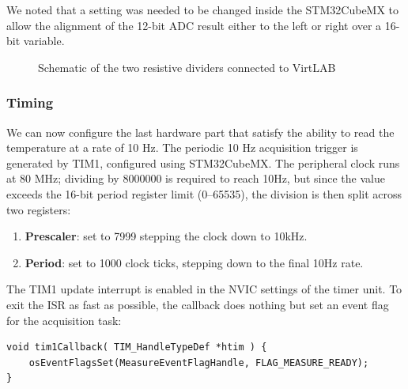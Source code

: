 \documentclass[../main.tex]{subfiles}
\begin{document}
We noted that a setting was needed to be changed inside the STM32CubeMX to allow the alignment of the 12-bit ADC result either to the left or right over a 16-bit variable.

\begin{figure}[h!]
\centering
{}
\caption{Schematic of the two resistive dividers connected to VirtLAB}
\label{fig:schematic}
\end{figure}


\subsubsection*{Timing}

We can now configure the last hardware part that satisfy the ability to read the temperature at a rate of 10 Hz. The periodic 10 Hz acquisition trigger is generated by TIM1, configured using STM32CubeMX.
The peripheral clock runs at 80 MHz; dividing by 8000000 is required to reach 10Hz, but since the value exceeds the 16-bit period register limit (0–65535), the division is then split across two registers:

\begin{enumerate}[label=\textbf{-}]
	\item \textbf{Prescaler}: set to 7999 stepping the clock down to 10kHz.
	\item \textbf{Period}: set to 1000 clock ticks, stepping down to the final 10Hz rate.
\end{enumerate}

The TIM1 update interrupt is enabled in the NVIC settings of the timer unit. To exit the ISR as fast as possible, the callback does nothing but set an event flag for the acquisition task:


\begin{lstlisting}
void tim1Callback( TIM_HandleTypeDef *htim ) {
    osEventFlagsSet(MeasureEventFlagHandle, FLAG_MEASURE_READY);
}
\end{lstlisting}
\end{document}
